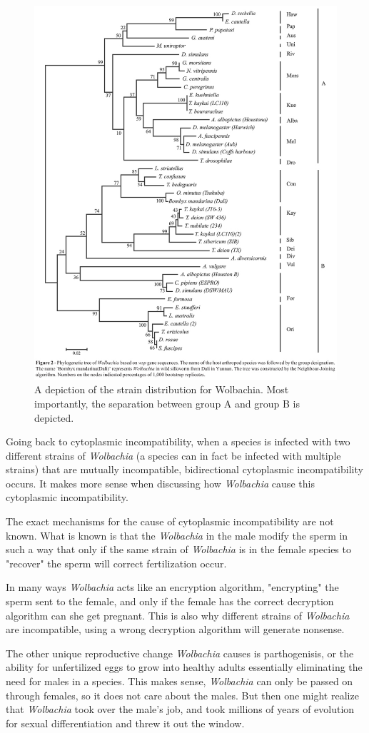 \documentclass[twocolumn]{article}
\begin{document}
\begin{figure}[!ht]
    \centering
    \includegraphics[width=.4\textwidth]{images/WolbachiaTree.jpg}
    \caption{ A depiction of the strain distribution for Wolbachia. Most importantly, the separation between group A and group B is depicted. \cite{Wtree_image} }
    \label{fig:wolbachia_tree}
\end{figure}

Going back to cytoplasmic incompatibility, when a species is infected with two different strains of \textit{Wolbachia} (a species can in fact be infected with multiple strains) that are mutually incompatible, bidirectional cytoplasmic incompatibility occurs.\cite{WbiCI} It makes more sense when discussing how \textit{Wolbachia} cause this cytoplasmic incompatibility.

The exact mechanisms for the cause of cytoplasmic incompatibility are not known. What is known is that the \textit{Wolbachia} in the male modify the sperm in such a way that only if the same strain of \textit{Wolbachia} is in the female species to "recover" the sperm will correct fertilization occur.\cite{Wbio}

In many ways \textit{Wolbachia} acts like an encryption algorithm, "encrypting" the sperm sent to the female, and only if the female has the correct decryption algorithm can she get pregnant. This is also why different strains of \textit{Wolbachia} are incompatible, using a wrong decryption algorithm will generate nonsense.

The other unique reproductive change \textit{Wolbachia} causes is parthogenisis, or the ability for unfertilized eggs to grow into healthy adults essentially eliminating the need for males in a species. This makes sense, \textit{Wolbachia} can only be passed on through females, so it does not care about the males. But then one might realize that \textit{Wolbachia} took over the male's job, and took millions of years of evolution for sexual differentiation and threw it out the window.
\end{document}
